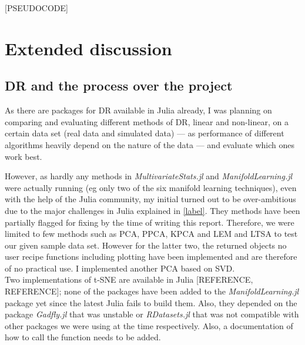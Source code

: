 \documentclass[journal, a4paper]{IEEEtran}
\begin{document}
[PSEUDOCODE]



\section{Extended discussion}

\subsection{DR and the process over the project}\label{discussion}

As there are packages for DR available in Julia already, I was planning on comparing and evaluating different methods of DR, linear and non-linear, on a certain data set (real data and simulated data) — as performance of different algorithms heavily depend on the nature of the data — and evaluate which ones work best. 

However, as hardly any methods in \textit{MultivariateStats.jl} and \textit{ManifoldLearning.jl} were actually running (eg only two of the six manifold learning techniques), even with the help of the Julia community, my initial turned out to be over-ambitious due to the major challenges in Julia explained in \ref{label}. 
They methods have been partially flagged for fixing by the time of writing this report. Therefore, we were limited to few methods such as PCA, PPCA, KPCA and LEM and LTSA to test our given sample data set. However for the latter two, the returned objects no user recipe functions including plotting have been implemented and are therefore of no practical use. I implemented another PCA based on SVD. \\


Two implementations of t-SNE are available in Julia [REFERENCE, REFERENCE]; none of the packages have been added to the \textit{ManifoldLearning.jl} package yet since the latest Julia fails to build them. Also, they depended on the package \textit{Gadfly.jl} that was unstable or \textit{RDatasets.jl} that was not compatible with other packages we were using at the time respectively. Also, a documentation of how to call the function needs to be added. \\
\end{document}
